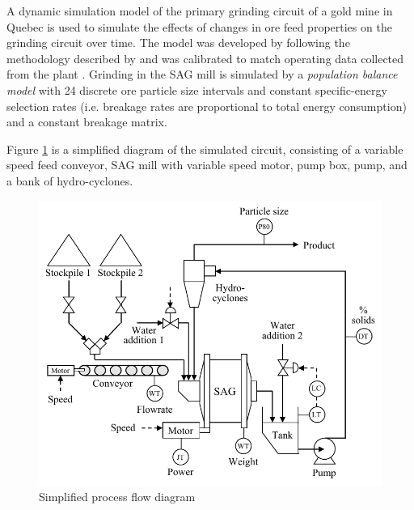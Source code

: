 
A dynamic simulation model of the primary grinding circuit of a gold mine in Quebec is used to simulate the effects of changes in ore feed properties on the grinding circuit over time. The model was developed by \cite{perez_garcia_dynamic_2020} following the methodology described by \cite{grimble_dynamic_2010} and was calibrated to match operating data collected from the plant \citep{perez-garcia_systematic_2020}. Grinding in the SAG mill is simulated by a \textit{population balance model} with 24 discrete ore particle size intervals and constant specific-energy selection rates (i.e. breakage rates are proportional to total energy consumption) and a constant breakage matrix.

Figure \ref{fig:sag-diag} is a simplified diagram of the simulated circuit, consisting of a variable speed feed conveyor, SAG mill with variable speed motor, pump box, pump, and a bank of hydro-cyclones.\begin{figure}[htp]
	\centering
	\includegraphics[width=12.5cm]{images/sag-circuit-diag.pdf}
	\caption{Simplified process flow diagram}
	\label{fig:sag-diag}
\end{figure}

